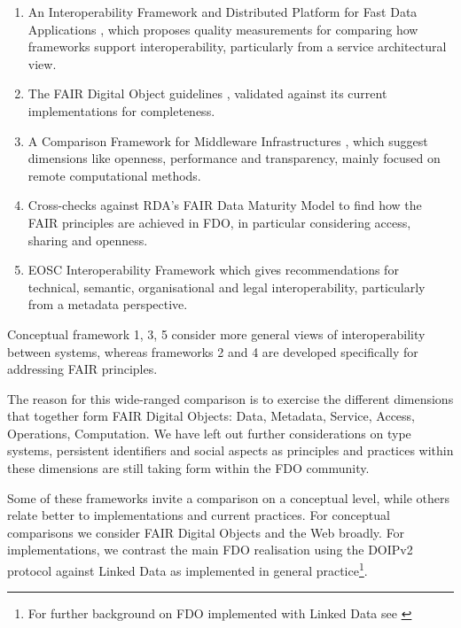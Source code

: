 \documentclass[fleqn,10pt,lineno]{wlpeerjlua}
\providecommand{\tightlist}{%
  \setlength{\itemsep}{0pt}\setlength{\parskip}{0pt}}
\begin{document}
\begin{enumerate}
\tightlist
\item
  An Interoperability Framework and Distributed Platform for Fast Data Applications \autocite{delgadoInteroperabilityFrameworkDistributed2016a}, which proposes quality measurements for comparing how frameworks support interoperability, particularly from a service architectural view.
\item
  The FAIR Digital Object guidelines \autocite{boninoFAIRDigitalObject}, validated against its current implementations for completeness.
\item
  A Comparison Framework for Middleware Infrastructures \autocite{zarrasComparisonFrameworkMiddleware2004a}, which suggest dimensions like openness, performance and transparency, mainly focused on remote computational methods.
\item
  Cross-checks against RDA's FAIR Data Maturity Model \autocite{bahimFAIRDataMaturity2020a} to find how the FAIR principles are achieved in FDO, in particular considering access, sharing and openness.
\item
  EOSC Interoperability Framework \autocite{corchoEOSCInteroperabilityFramework2021b} which gives recommendations for technical, semantic, organisational and legal interoperability, particularly from a metadata perspective.
\end{enumerate}

Conceptual framework 1, 3, 5 consider more general views of interoperability between systems, whereas frameworks 2 and 4 are developed specifically for addressing FAIR principles. 

The reason for this wide-ranged comparison is to exercise the different dimensions that together form FAIR Digital Objects: Data, Metadata, Service, Access, Operations, Computation.
We have left out further considerations on type systems, persistent identifiers and social aspects as principles and practices within these dimensions are still taking form within the FDO community.



Some of these frameworks invite a comparison on a conceptual level, while others relate better to implementations and current practices. For conceptual comparisons we consider FAIR Digital Objects and the Web broadly. For implementations, we contrast the main FDO realisation using the DOIPv2 protocol \autocite{foundationDigitalObjectInterface} against Linked Data as implemented in general practice\footnote{For further background on FDO implemented with Linked Data see \autocite{FDOFramework,10.3897/rio.8.e94501}}.
\end{document}
